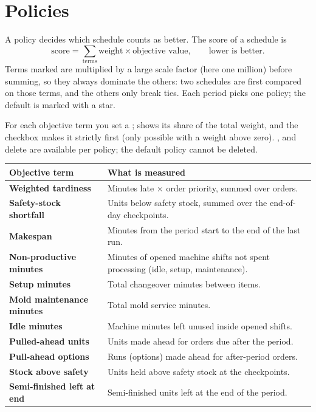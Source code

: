 \section{Policies}\label{sec:policies}

A policy decides which schedule counts as better. The score of a schedule is
\[ \text{score} = \sum_{\text{terms}} \text{weight} \times \text{objective value}, \qquad \text{lower is better}. \]
Terms marked  are multiplied by a large scale factor (here one million) before summing, so
they always dominate the others: two schedules are first compared on those terms, and the others only break
ties. Each period picks one policy; the default is marked with a star.


For each objective term you set a ;  shows its share of the total weight, and the
checkbox makes it strictly first (only possible with a weight above zero). ,
 and delete are available per policy; the default policy cannot be deleted.

\begin{center}
\begin{tabularx}{\linewidth}{>{\bfseries}p{4.4cm}X}
\toprule
\rowcolor{white}Objective term & What is measured \\
\midrule
Weighted tardiness & Minutes late $\times$ order priority, summed over orders. \\
Safety-stock shortfall & Units below safety stock, summed over the end-of-day checkpoints. \\
Makespan & Minutes from the period start to the end of the last run. \\
Non-productive minutes & Minutes of opened machine shifts not spent processing (idle, setup, maintenance). \\
Setup minutes & Total changeover minutes between items. \\
Mold maintenance minutes & Total mold service minutes. \\
Idle minutes & Machine minutes left unused inside opened shifts. \\
Pulled-ahead units & Units made ahead for orders due after the period. \\
Pull-ahead options & Runs (options) made ahead for after-period orders. \\
Stock above safety & Units held above safety stock at the checkpoints. \\
Semi-finished left at end & Semi-finished units left at the end of the period. \\
\bottomrule
\end{tabularx}
\end{center}

